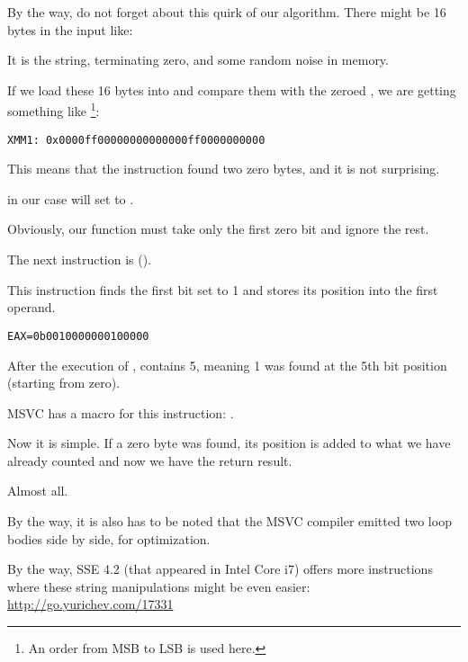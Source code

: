 By the way, do not forget about this quirk of our algorithm.
There might be 16 bytes in the input like:



It is the  string, terminating zero, and some random noise in memory.

If we load these 16 bytes into  and compare them with the zeroed , 
we are getting something like
\footnote{An order from \ac{MSB} to \ac{LSB} is used here.}:

\begin{verbatim}
XMM1: 0x0000ff00000000000000ff0000000000
\end{verbatim}

This means that the instruction found two zero bytes, and it is not surprising.
 
 in our case will set \EAX to .

Obviously, our function must take only the first zero bit and ignore the rest.

\label{instruction_BSF}
The next instruction is  (). 

This instruction finds the first bit set to 1 and stores its position into the first operand.

\begin{verbatim}
EAX=0b0010000000100000
\end{verbatim}

After the execution of , \EAX contains 5, meaning 
1 was found at the 5th bit position (starting from zero).

MSVC has a macro for this instruction: .

Now it is simple. If a zero byte was found, its position is added to what we have already counted and now we have 
the return result.

Almost all.

By the way, it is also has to be noted that the MSVC compiler emitted two loop bodies side by side, for optimization.

By the way, SSE 4.2 (that appeared in Intel Core i7) offers more instructions where these string manipulations might be
even easier: \url{http://go.yurichev.com/17331}

